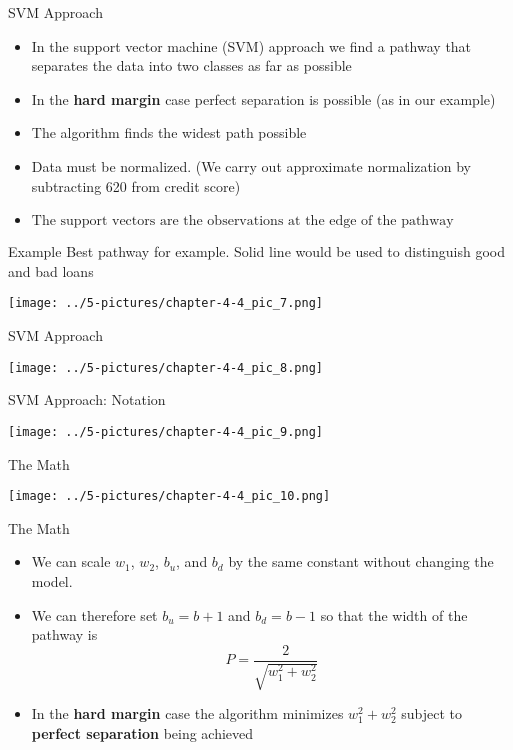 \documentclass[11pt]{beamer}
\newcommand{\highlight}[1]{%
  \colorbox{yellow!100}{$\displaystyle#1$}}
\begin{document}
\begin{frame}{SVM Approach}
	\begin{itemize}
		\item In the support vector machine (SVM) approach we find a pathway that separates the data into two classes as far as possible
		\item In the \textbf{hard margin} case perfect separation is possible (as in our example)
		\item The algorithm finds the widest path possible
		\item Data must be normalized. (We carry out approximate normalization by subtracting 620 from credit score)
		\item \highlight{\text{The support vectors are the observations at the edge of the pathway}}
	\end{itemize}
\end{frame}
\begin{frame}{Example}
	Best pathway for example. Solid line would be used to distinguish good and bad loans
	\begin{center}
	\texttt{[image: ../5-pictures/chapter-4-4\_pic\_7.png]}
	\end{center}
\end{frame}
\begin{frame}{SVM Approach}
	\begin{center}
	\texttt{[image: ../5-pictures/chapter-4-4\_pic\_8.png]}
	\end{center}
\end{frame}
\begin{frame}{SVM Approach: Notation}
	\begin{center}
	\texttt{[image: ../5-pictures/chapter-4-4\_pic\_9.png]}
	\end{center}
\end{frame}
\begin{frame}{The Math}
	\begin{center}
	\texttt{[image: ../5-pictures/chapter-4-4\_pic\_10.png]}
	\end{center}
\end{frame}
\begin{frame}{The Math}
	\begin{itemize}
		\item We can scale $w_1$, $w_2$, $b_u$, and $b_d$  by the same constant without changing the model. 
		\item We can therefore set $b_u=b+1$ and $b_d=b-1$ so that the width of the pathway is $$P = \frac{2}{\sqrt{w_1^2+w_2^2}}$$
		\item In the \textbf{hard margin} case the algorithm minimizes $w_1^2+w_2^2$ subject to \textbf{perfect separation} being achieved
	\end{itemize}
\end{frame}
\end{document}
